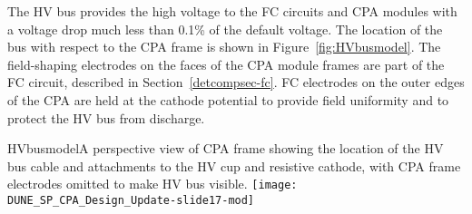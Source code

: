 The HV bus provides the high voltage to the FC
circuits and CPA modules with a voltage drop much less than 0.1\% of the
default voltage. The location of the bus with respect to the CPA frame is shown in Figure~\ref{fig:HVbusmodel}. The field-shaping electrodes on the faces of the CPA module
frames are part of the FC circuit, described in Section~\ref{detcompsec-fc}. 
FC electrodes on the outer edges of the
CPA are held at the cathode potential to provide field
uniformity and to protect the HV bus from discharge.  

\begin{cdrfigure}{HVbusmodel}{A perspective view of CPA frame showing the location of the HV bus cable and attachments to the HV cup and resistive cathode, with CPA frame electrodes omitted to make HV bus visible.}
\texttt{[image: DUNE\_SP\_CPA\_Design\_Update-slide17-mod]}
\end{cdrfigure}


